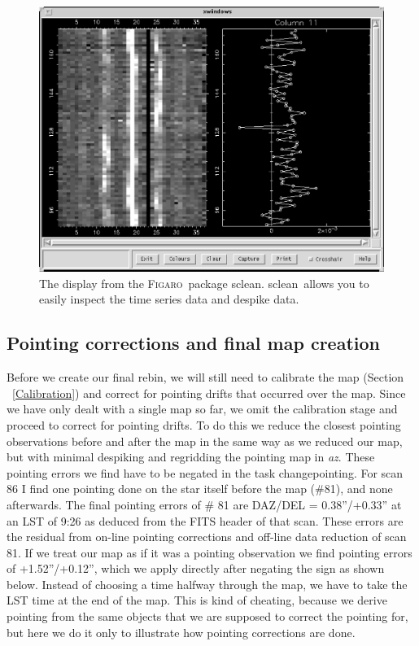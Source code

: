 \documentclass[twoside,11pt]{article}
\newcommand{\Figaro}{\xref{\textsc{Figaro}}{sun86}{}}
\newcommand{\task}[1]{\textsf{#1}}
\newcommand{\rebin}{\xref{\task{rebin}}{sun216}{REBIN}}
\newcommand{\chgpnt}{\xref{\task{change\_pointing}}{sun216}{CHANGE_POINTING}}
\newcommand{\sclean}{\xref{\task{sclean}}{sun86}{SCLEAN}}
\newcommand{\xref}[3]{#1}
\newcommand{\xlabel}[1]{}
\renewcommand{\_}{\texttt{\symbol{95}}}
\begin{document}
\begin{figure}
\begin{center}
\includegraphics[width=6in]{sc11_fig6.eps}
\caption{The display from the \Figaro\ package \sclean. \sclean\ allows
you to easily inspect the time series data and despike data. }
\label{fig:clean}
\end{center}
\end{figure}



\subsection{\xlabel{Pointing}Pointing corrections and final map
creation}

Before we create our final \rebin, we will still need to calibrate the
map (Section \ \ref{Calibration}) and correct for pointing drifts that
occurred over the map. Since we have only dealt with a single map so
far, we omit the calibration stage and proceed to correct for pointing
drifts. To do this we reduce the closest pointing observations before
and after the map in the same way as we reduced our map, but with
minimal despiking and regridding the pointing map in {\it az}.  These
pointing errors we find have to be negated in the task \chgpnt. For
scan 86 I find one pointing done on the star itself before the map
(\#81), and none afterwards. The final pointing errors of \# 81 are
DAZ/DEL = 0.38''/+0.33'' at an LST of 9:26 as deduced from the FITS
header of that scan. These errors are the residual from on-line
pointing corrections and off-line data reduction of scan 81. If we
treat our map as if it was a pointing observation we find pointing
errors of +1.52''/+0.12'', which we apply directly after negating the
sign as shown below. Instead of choosing a time halfway through the
map, we have to take the LST time at the end of the map.  This is kind
of cheating, because we derive pointing from the same objects that we
are supposed to correct the pointing for, but here we do it only to
illustrate how pointing corrections are done.
\end{document}

